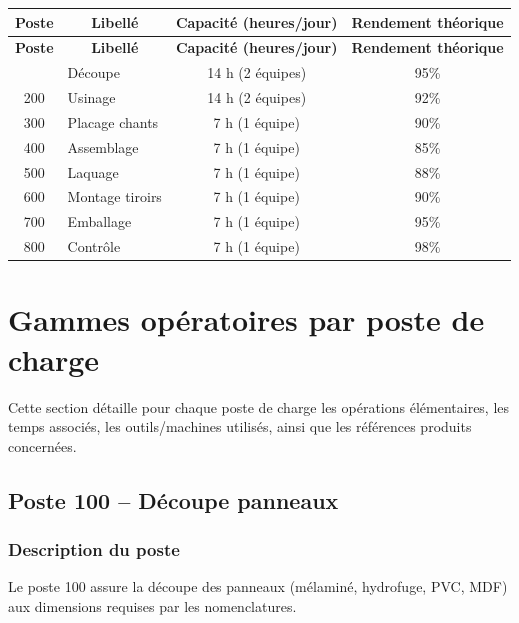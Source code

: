 \documentclass[12pt,a4paper]{article}
\begin{document}
\begin{longtable}{|c|p{4cm}|c|c|}
\hline
\multicolumn{1}{|c|}{\textbf{Poste}} & \multicolumn{1}{c|}{\textbf{Libellé}} & \multicolumn{1}{c|}{\textbf{Capacité (heures/jour)}} & \multicolumn{1}{c|}{\textbf{Rendement théorique}} \\
\hline
\endfirsthead
\hline
\multicolumn{1}{|c|}{\textbf{Poste}} & \multicolumn{1}{c|}{\textbf{Libellé}} & \multicolumn{1}{c|}{\textbf{Capacité (heures/jour)}} & \multicolumn{1}{c|}{\textbf{Rendement théorique}} \\
\hline
\endhead
\hline
\endfoot
100 & Découpe & 14 h (2 équipes) & 95\% \\
200 & Usinage & 14 h (2 équipes) & 92\% \\
300 & Placage chants & 7 h (1 équipe) & 90\% \\
400 & Assemblage & 7 h (1 équipe) & 85\% \\
500 & Laquage & 7 h (1 équipe) & 88\% \\
600 & Montage tiroirs & 7 h (1 équipe) & 90\% \\
700 & Emballage & 7 h (1 équipe) & 95\% \\
800 & Contrôle & 7 h (1 équipe) & 98\% \\
\hline
\end{longtable}

\section{Gammes opératoires par poste de charge}

Cette section détaille pour chaque poste de charge les opérations élémentaires, les temps associés, les outils/machines utilisés, ainsi que les références produits concernées.

\subsection{Poste 100 – Découpe panneaux}

\subsubsection{Description du poste}
Le poste 100 assure la découpe des panneaux (mélaminé, hydrofuge, PVC, MDF) aux dimensions requises par les nomenclatures.
\end{document}
